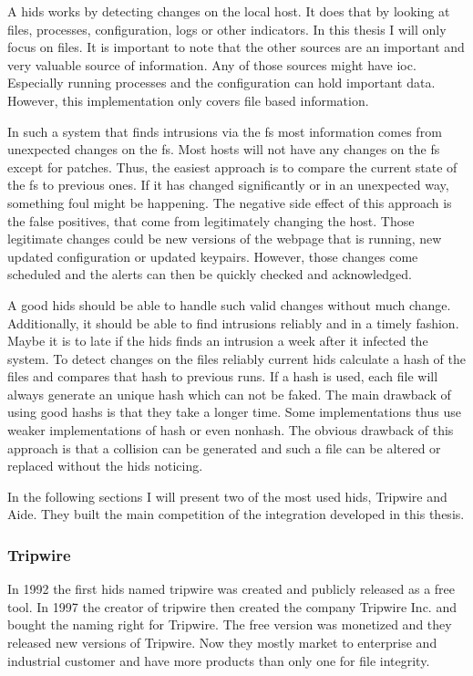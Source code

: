 \documentclass[
	a4paper,					%
	10pt,							%
	twoside,					%
	openright,				%
	notitlepage,			%
	parskip=half,			%
]{scrreprt}					%
\begin{document}
A \gls{hids} works by detecting changes on the local host. It does that by looking at files, processes, configuration, logs or other indicators. In this thesis I will only focus on files. It is important to note that the other sources are an important and very valuable source of information. Any of those sources might have \gls{ioc}. Especially running processes and the configuration can hold important data. However, this implementation only covers file based information.

In such a system that finds intrusions via the \gls{fs} most information comes from unexpected changes on the \gls{fs}. Most hosts will not have any changes on the \gls{fs} except for patches. Thus, the easiest approach is to compare the current state of the \gls{fs} to previous ones. If it has changed significantly or in an unexpected way, something foul might be happening. The negative side effect of this approach is the false positives, that come from legitimately changing the host. Those legitimate changes could be new versions of the webpage that is running, new updated configuration or updated keypairs. However, those changes come scheduled and the alerts can then be quickly checked and acknowledged.

A good \gls{hids} should be able to handle such valid changes without much change. Additionally, it should be able to find intrusions reliably and in a timely fashion. Maybe it is to late if the \gls{hids} finds an intrusion a week after it infected the system. To detect changes on the files reliably current \gls{hids} calculate a hash of the files and compares that hash to previous runs. If a \gls{hash} is used, each file will always generate an unique hash which can not be faked. The main drawback of using good \glspl{hash} is that they take a longer time. Some implementations thus use weaker implementations of \gls{hash} or even \gls{nonhash}. The obvious drawback of this approach is that a collision can be generated and such a file can be altered or replaced without the \gls{hids} noticing. 

In the following sections I will present two of the most used \gls{hids}, Tripwire and Aide. They built the main competition of the integration developed in this thesis.

\subsubsection{Tripwire}
\label{sec:tripwire}

In 1992 the first \gls{hids} named tripwire was created and publicly released as a free tool. In 1997 the creator of tripwire then created the company Tripwire Inc. and bought the naming right for Tripwire. The free version was monetized and they released new versions of Tripwire. \cite{Tripwire:Impl,Tripwire:company} Now they mostly market to enterprise and industrial customer and have more products than only one for file integrity. \cite{tripwire}
\end{document}

